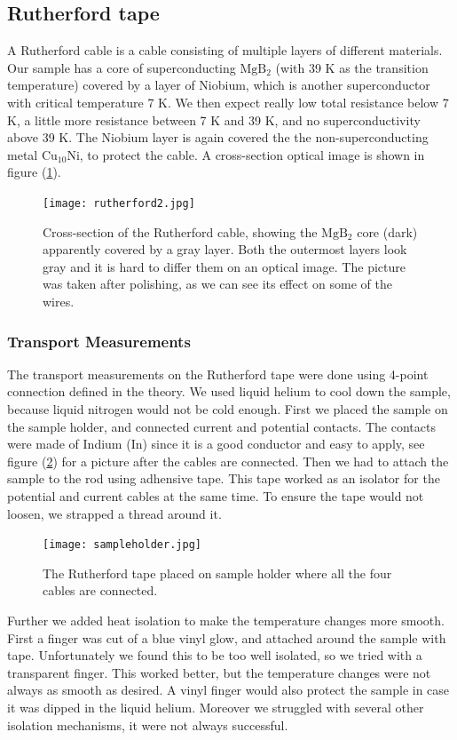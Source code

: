 \documentclass{comjnl}
\newcommand*\chem[1]{\ensuremath{\mathrm{#1}}}
\begin{document}
\subsection{Rutherford tape}
A Rutherford cable is a cable consisting of multiple layers of different materials. Our sample has a core of superconducting \chem{MgB_2} (with 39 K as the transition temperature) covered by a layer of Niobium, which is another superconductor with critical temperature 7 K. We then expect really low total resistance below 7 K, a little more resistance between 7 K and 39 K, and no superconductivity above 39 K. The Niobium layer is again covered the the non-superconducting metal \chem{Cu_{10}Ni}, to protect the cable. A cross-section optical image is shown in figure (\ref{fig:rutherford2}).
\begin{figure}[h]
\centering
\texttt{[image: rutherford2.jpg]}
\caption{Cross-section of the Rutherford cable, showing the \chem{MgB_2} core (dark) apparently covered by a gray layer. Both the outermost layers look gray and it is hard to differ them on an optical image. The picture was taken after polishing, as we can see its effect on some of the wires. \label{fig:rutherford2}}
\end{figure}

\subsubsection{Transport Measurements}
The transport measurements on the Rutherford tape were done using 4-point connection defined in the theory. We used liquid helium to cool down the sample, because liquid nitrogen would not be cold enough. First we placed the sample on the sample holder, and connected current and potential contacts. The contacts were made of Indium (In) since it is a good conductor and easy to apply, see figure (\ref{fig:sampleholder}) for a picture after the cables are connected. Then we had to attach the sample to the rod using adhensive tape. This tape worked as an isolator for the potential and current cables at the same time. To ensure the tape would not loosen, we strapped a thread around it. 

\begin{figure}[h]
\centering
\texttt{[image: sampleholder.jpg]}
\caption{The Rutherford tape placed on sample holder where all the four cables are connected.  \label{fig:sampleholder}}
\end{figure}

Further we added heat isolation to make the temperature changes more smooth. First a finger was cut of a blue vinyl glow, and attached around the sample with tape. Unfortunately we found this to be too well isolated, so we tried with a transparent finger. This worked better, but the temperature changes were not always as smooth as desired. A vinyl finger would also protect the sample in case it was dipped in the liquid helium. Moreover we struggled with several other isolation mechanisms, it were not always successful. 
\end{document}

